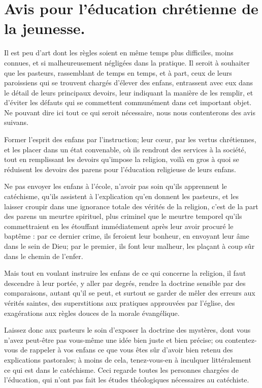 \documentclass[instructions.tex]{subfiles}
\begin{document}
 
\chapter{Avis pour l'éducation chrétienne de la jeunesse.}
 
Il est peu d’art dont les règles soient en même temps plus difficiles, moins connues, et si malheureusement négligées dans la pratique. Il seroit à souhaiter que les pasteurs, rassemblant de temps en temps, et à part, ceux de leurs paroissiens qui se trouvent chargés d’élever des enfans, entrassent avec eux dans le détail de leurs principaux devoirs, leur indiquant la manière de les remplir, et d’éviter les défauts qui se commettent communément dans cet important objet. Ne pouvant dire ici tout ce qui seroit nécessaire, nous nous contenterons des avis suivans.
 
Former l’esprit des enfans par l’instruction; leur cœur, par les vertus chrétiennes, et les placer dans un état convenable, où ils rendront des services à la société, tout en remplissant les devoirs qu’impose la religion, voilà en gros à quoi se réduisent les devoirs des parens pour l’éducation religieuse de leurs enfans.
 
\primo Ne pas envoyer les enfans à l’école, n’avoir pas soin qu’ils apprennent le catéchisme, qu’ils assistent à l’explication qu’en donnent les pasteurs, et les laisser croupir dans une ignorance totale des vérités de la religion, c’est de la part des parens un meurtre spirituel, plus criminel que le meurtre temporel qu’ils commettraient en les étouffant immédiatement après leur avoir procuré le baptême : par ce dernier crime, ils feroient leur bonheur, en envoyant leur âme dans le sein de Dieu; par le premier, ils font leur malheur, les plaçant à coup sûr dans le chemin de l’enfer.
 
Mais tout en voulant instruire les enfans de ce qui concerne la religion, il faut descendre à leur portée, y aller par degrés, rendre la doctrine sensible par des comparaisons, autant qu’il se peut, et surtout se garder de mêler des erreurs aux vérités saintes, des superstitions aux pratiques approuvées par l’église, des exagérations aux règles douces de la morale évangélique.
 
Laissez donc aux pasteurs le soin d’exposer la doctrine des mystères, dont vous n’avez peut-être pas vous-même une idée bien juste et bien précise; ou contentez-vous de rappeler à vos enfans ce que vous êtes sûr d’avoir bien retenu des explications pastorales; à moins de cela, tenez-vous-en à inculquer littéralement ce qui est dans le catéchisme. Ceci regarde toutes les personnes chargées de l’éducation, qui n’ont pas fait les études théologiques nécessaires au catéchiste.
 
\end{document}
